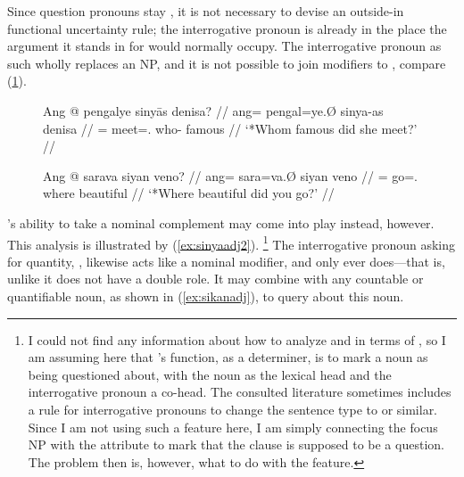 Since question pronouns stay , it is not necessary to devise an
outside-in functional uncertainty rule; the interrogative pronoun is already in
the place the argument it stands in for would normally occupy. The
interrogative pronoun as such wholly replaces an NP, and it is not possible to
join modifiers to , compare (\ref{ex:itradj}).

\begin{figure}[h]
\pex\label{ex:itradj}
\a\ljudge*\begingl
	\gla Ang @ pengalye sinyās denisa? //
	\glb ang= pengal=ye.Ø sinya-as denisa //
	\glc \AgtT{}= meet=\TsgF{}.\Top{} who-\Parg{} famous //
	\glft `*Whom famous did she meet?' //
\endgl

\a\ljudge*\begingl
	\gla Ang @ sarava siyan veno? //
	\glb ang= sara=va.Ø siyan veno //
	\glc \Aarg{}= go=\Second{}.\Top{} where beautiful //
	\glft `*Where beautiful did you go?' //
\endgl
\xe
\end{figure}

's ability to take a nominal complement may come into play
instead, however. This analysis is illustrated by (\ref{ex:sinyaadj2}).%
\footnote{I could not find any information about how to analyze  and
 in terms of \Lfg{}, so I am assuming here that 's function,
as a determiner, is to mark a noun as being questioned about, with the noun as
the lexical head and the interrogative pronoun a co-head. The consulted
literature sometimes includes a rule for interrogative pronouns to change the
sentence type to  or similar. Since I am not using such a
feature here, I am simply connecting the focus NP with the \Q{} attribute to
mark that the clause is supposed to be a question. The problem then is,
however, what to do with the \Prontype{} feature.} The interrogative pronoun
asking for quantity, , likewise acts
like a nominal modifier, and only ever does---that is, unlike
 it does not have a double role. It may combine with any
countable or quantifiable noun, as shown in (\ref{ex:sikanadj}), to query about
this noun.

